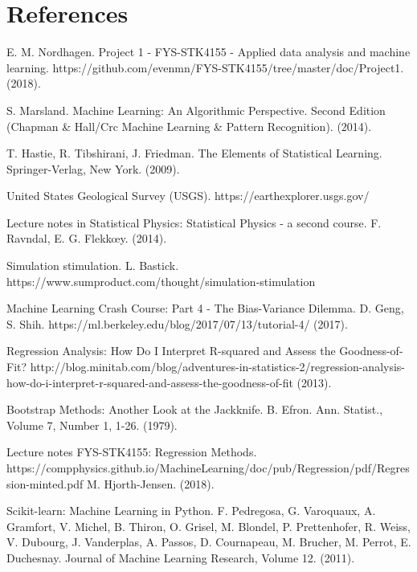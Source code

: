 \newpage
\section{References}

\begingroup
\renewcommand{\section}[2]{}
\begin{thebibliography}{}
	E. M. Nordhagen.
	Project 1 - FYS-STK4155 - Applied data analysis and machine learning.
	https://github.com/evenmn/FYS-STK4155/tree/master/doc/Project1.
	(2018).
	
	S. Marsland.
	Machine Learning: An Algorithmic Perspective. Second Edition (Chapman \& Hall/Crc Machine Learning \& Pattern Recognition).
	(2014).
	
	T. Hastie, R. Tibshirani, J. Friedman.
	The Elements of Statistical Learning.
	Springer-Verlag, New York.
	(2009).
	
	United States Geological Survey (USGS).
	https://earthexplorer.usgs.gov/
	
	Lecture notes in Statistical Physics: Statistical Physics - a second course.
	F. Ravndal, E. G. Flekk\oe y.
	(2014).
	
	Simulation stimulation.
	L. Bastick.
	https://www.sumproduct.com/thought/simulation-stimulation
	
	Machine Learning Crash Course: Part 4 - The Bias-Variance Dilemma.
	D. Geng, S. Shih.
	https://ml.berkeley.edu/blog/2017/07/13/tutorial-4/
	(2017).
	
	Regression Analysis: How Do I Interpret R-squared and Assess the Goodness-of-Fit?
	http://blog.minitab.com/blog/adventures-in-statistics-2/regression-analysis-how-do-i-interpret-r-squared-and-assess-the-goodness-of-fit
	(2013).
	
	Bootstrap Methods: Another Look at the Jackknife.
	B. Efron. 
	Ann. Statist., Volume 7, Number 1, 1-26.
	(1979).
	
	Lecture notes FYS-STK4155: Regression Methods.
	https://compphysics.github.io/MachineLearning/doc/pub/Regression/pdf/Regression-minted.pdf
	M. Hjorth-Jensen.
	(2018).
	
	Scikit-learn: Machine Learning in Python.
	F. Pedregosa, G. Varoquaux, A. Gramfort, V. Michel, B. Thiron, O. Grisel, M. Blondel, P. Prettenhofer, R. Weiss, V. Dubourg, J. Vanderplas, A. Passos, D. Cournapeau, M. Brucher, M. Perrot, E. Duchesnay.
    Journal of Machine Learning Research, Volume 12.
	(2011).
	
\end{thebibliography}
\endgroup